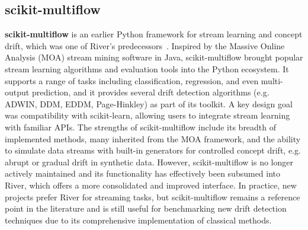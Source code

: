 \subsection{scikit-multiflow}
\textbf{scikit-multiflow} is an earlier Python framework for stream learning and concept drift, which was one of River's predecessors~\cite{montiel2018scikit}.
Inspired by the Massive Online Analysis (MOA) stream mining software in Java, scikit-multiflow brought popular stream learning algorithms and evaluation tools into the Python ecosystem.
It supports a range of tasks including classification, regression, and even multi-output prediction, and it provides several drift detection algorithms (e.g. ADWIN, DDM, EDDM, Page-Hinkley) as part of its toolkit.
A key design goal was compatibility with scikit-learn, allowing users to integrate stream learning with familiar APIs.
The strengths of scikit-multiflow include its breadth of implemented methods, many inherited from the MOA framework, and the ability to simulate data streams with built-in generators for controlled concept drift, e.g. abrupt or gradual drift in synthetic data.
However, scikit-multiflow is no longer actively maintained and its functionality has effectively been subsumed into River, which offers a more consolidated and improved interface.
In practice, new projects prefer River for streaming tasks, but scikit-multiflow remains a reference point in the literature and is still useful for benchmarking new drift detection techniques due to its comprehensive implementation of classical methods.

